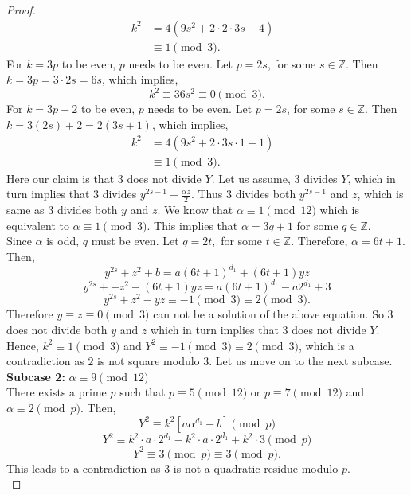 \documentclass[12pt, reqno]{amsart}
\numberwithin{equation}{section}
\theoremstyle{definition}
\theoremstyle{nodefstyle}
\begin{document}
\begin{proof}
        \begin{align*}
        k^2&=4(9s^2+2\cdot2\cdot3s+4)&\\
        &\equiv 1 \pmod{3}.&
        \end{align*}
        For $k=3p$ to be even, $p$ needs to be even. Let $p=2s$, for some $s \in \mathbb{Z}$. Then $k=3p=3\cdot2s=6s$, which implies,
        \[k^2 \equiv 36s^2 \equiv 0 \pmod{3}.\]
        For $k=3p+2$ to be even, $p$ needs to be even. Let $p=2s$, for some $s \in \mathbb{Z}$. Then $k=3(2s)+2=2(3s+1)$, which implies,
        \begin{align*}
        k^2&=4(9s^2+2\cdot3s\cdot1+1)&\\
        &\equiv 1 \pmod{3}.&
        \end{align*}
    Here our claim is that $3$ does not divide $Y$. Let us assume, $3$ divides $Y$, which in turn implies that 
    $3$ divides $y^{2s-1}-\frac{\alpha z}{2}$. Thus 
    $3$ divides both $y^{2s-1}$ and $z$, which is same as $3$ divides both $y$ and $z$. We know that $\alpha \equiv 1 \pmod{12}$ which is equivalent to $\alpha \equiv 1 \pmod{3}$. This implies that $\alpha =3q+1$ for some $q \in \mathbb{Z}$.\\
    Since $\alpha$ is odd, $q$ must be even. Let $q=2t,$ for some $ t\in \mathbb{Z}$. Therefore, $\alpha = 6t+1.$ Then,
    \[y^{2s}+z^2+b=a(6t+1)^{d_1}+(6t+1)yz\]
    \[ y^{2s}++z^2-(6t+1)yz=a(6t+1)^{d_1}-a2^{d_1}+3\]
    \[ y^{2s}+z^2-yz \equiv -1\pmod{3} \equiv 2\pmod{3}.\]
    Therefore $y \equiv z \equiv 0 \pmod{3}$ can not be a solution of the above equation. So $3$ does not divide both $y$ and $z$ which in turn implies that $3$ does not divide $Y$. Hence, $k^2 \equiv 1 \pmod{3}$ and $Y^2 \equiv -1 \pmod{3} \equiv 2 \pmod{3}$, which is a contradiction as $2$ is not square modulo $3$. Let us move on to the next subcase.\\
    \vspace{2mm}
    \textbf{Subcase 2:} $\alpha \equiv 9 \pmod{12}$\\
    \vspace{2mm}
    There exists a prime $p$ such that $p \equiv 5 \pmod{12}$ or $p \equiv 7 \pmod{12}$ and $\alpha \equiv 2 \pmod{p}.$
    Then,\[Y^2 \equiv k^2\left[a\alpha ^{d_1}-b\right] \pmod{p}\]
    \[ Y^2 \equiv k^2\cdot a\cdot2^{d_1}-k^2\cdot a\cdot2^{d_1}+k^2\cdot3 \pmod{p}\]
    \[ Y^2 \equiv 3 \pmod{p} \equiv 3 \pmod{p}.\]
    This leads to a contradiction as 3 is not a quadratic residue modulo $p$.\\
    \vspace{2mm}

\end{proof}
\end{document}
